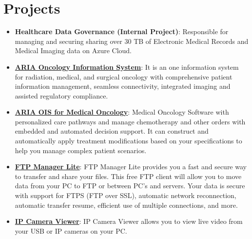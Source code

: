 \documentclass[letterpaper,11pt]{article}
\newcommand{\resumeItem}[2]{
  \item\small{ 
    \textbf{ #1}{: #2 \vspace{-2pt}}
  }
}
\newcommand{\resumeSubItem}[2]{\resumeItem{#1}{#2}\vspace{-4pt}}
\newcommand{\resumeSubHeadingListStart}{\begin{itemize}[leftmargin=*]}
\newcommand{\resumeSubHeadingListEnd}{\end{itemize}}
\begin{document}
\section{Projects}
  \resumeSubHeadingListStart
    \resumeSubItem{Healthcare Data Governance (Internal Project)}
      {Responsible for managing and securing sharing over 30 TB of Electronic Medical Records and Medical Imaging data on Azure Cloud.}
    \resumeSubItem{\href{https://www.varian.com/products/software/information-systems/aria-oncology-information-system}{ARIA Oncology Information System}}
      {It is an one information system for radiation, medical, and surgical oncology with comprehensive patient information management, seamless connectivity, integrated imaging and assisted regulatory compliance.}
    \resumeSubItem{\href{https://www.varian.com/products/software/information-systems/aria-ois-medical-oncology}{ARIA OIS for Medical Oncology}}
      {Medical Oncology Software with personalized care pathways and manage chemotherapy and other orders with embedded and automated decision support. It can construct and automatically apply treatment modifications based on your specifications to help you manage complex patient scenarios.}
    \resumeSubItem{\href{https://www.deskshare.com/ftp-manager-free.aspx}{FTP Manager Lite}}
      {FTP Manager Lite provides you a fast and secure way to transfer and share your files.  This free FTP client will allow you to move data from your PC to FTP or between PC's and servers.  Your data is secure with support for FTPS (FTP over SSL), automatic network reconnection, automatic transfer resume, efficient use of multiple connections, and more.}
    \resumeSubItem{\href{https://www.deskshare.com/ip-camera-viewer.aspx}{IP Camera Viewer}}
      {IP Camera Viewer allows you to view live video from your USB or IP cameras on your PC.}
  \resumeSubHeadingListEnd


\end{document}
